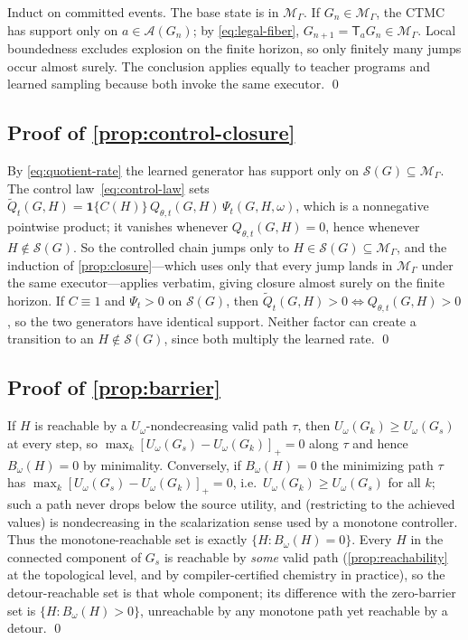 \documentclass{article}
\newcommand{\M}{\mathcal{M}_{\Gamma}}
\newcommand{\A}{\mathcal{A}}
\newcommand{\Sset}{\mathcal{S}}
\newcommand{\T}{\mathsf{T}}
\newcommand{\one}{\mathbf{1}}
\theoremstyle{definition}
\theoremstyle{remark}
\begin{document}
Induct on committed events. The base state is in $\M$. If $G_n\in\M$, the CTMC has support only on $a\in\A(G_n)$; by \eqref{eq:legal-fiber}, $G_{n+1}=\T_aG_n\in\M$. Local boundedness excludes explosion on the finite horizon, so only finitely many jumps occur almost surely. The conclusion applies equally to teacher programs and learned sampling because both invoke the same executor. \qed

\subsection{Proof of \cref{prop:control-closure}}

By \eqref{eq:quotient-rate} the learned generator has support only on $\Sset(G)\subseteq\M$. The control law~\eqref{eq:control-law} sets $\widetilde Q_t(G,H)=\one\{C(H)\}\,Q_{\theta,t}(G,H)\,\Psi_t(G,H,\omega)$, which is a nonnegative pointwise product; it vanishes whenever $Q_{\theta,t}(G,H)=0$, hence whenever $H\notin\Sset(G)$. So the controlled chain jumps only to $H\in\Sset(G)\subseteq\M$, and the induction of \cref{prop:closure}---which uses only that every jump lands in $\M$ under the same executor---applies verbatim, giving closure almost surely on the finite horizon. If $C\equiv1$ and $\Psi_t>0$ on $\Sset(G)$, then $\widetilde Q_t(G,H)>0 \iff Q_{\theta,t}(G,H)>0$, so the two generators have identical support. Neither factor can create a transition to an $H\notin\Sset(G)$, since both multiply the learned rate. \qed

\subsection{Proof of \cref{prop:barrier}}

If $H$ is reachable by a $U_\omega$-nondecreasing valid path $\tau$, then $U_\omega(G_k)\ge U_\omega(G_s)$ at every step, so $\max_k[U_\omega(G_s)-U_\omega(G_k)]_+=0$ along $\tau$ and hence $B_\omega(H)=0$ by minimality. Conversely, if $B_\omega(H)=0$ the minimizing path $\tau$ has $\max_k[U_\omega(G_s)-U_\omega(G_k)]_+=0$, i.e.\ $U_\omega(G_k)\ge U_\omega(G_s)$ for all $k$; such a path never drops below the source utility, and (restricting to the achieved values) is nondecreasing in the scalarization sense used by a monotone controller. Thus the monotone-reachable set is exactly $\{H:B_\omega(H)=0\}$. Every $H$ in the connected component of $G_s$ is reachable by \emph{some} valid path (\cref{prop:reachability} at the topological level, and by compiler-certified chemistry in practice), so the detour-reachable set is that whole component; its difference with the zero-barrier set is $\{H:B_\omega(H)>0\}$, unreachable by any monotone path yet reachable by a detour. \qed
\end{document}
